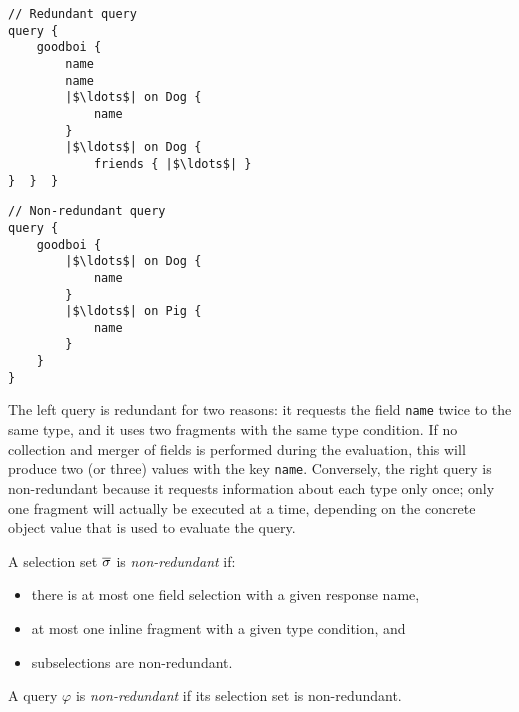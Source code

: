 \smallskip

\begin{minipage}[t]{.25\textwidth}
\begin{verbatim}
// Redundant query
query {
    goodboi {
        name
        name
        |$\ldots$| on Dog {
            name
        }
        |$\ldots$| on Dog {
            friends { |$\ldots$| }
}  }  }
\end{verbatim}
\end{minipage}%
\begin{minipage}[t]{.25\textwidth}
\begin{verbatim}
// Non-redundant query
query {
    goodboi {
        |$\ldots$| on Dog {
            name
        }
        |$\ldots$| on Pig {
            name
        }
    } 
}
\end{verbatim} 
\end{minipage}

\bigskip

The left query is redundant for two reasons: it requests the field
\texttt{name} twice to the same type, and it uses two fragments with
the same type condition. If no collection and merger
of fields is performed during the evaluation, this will produce two (or three) values with the key \texttt{name}. 
Conversely, the right query is non-redundant because it requests information about each type only once; only one fragment will actually be executed at a time, depending on the concrete object value that is used to evaluate the query.

\begin{definition}
A \gql selection set $\overline{\sigma}$ is \textit{non-redundant} if:
\begin{itemize}
    \item there is at most one field selection with a given response name, 
    
    \item at most one inline fragment with a given type condition, and
    
    \item subselections are non-redundant.
    \end{itemize}

\noindent    A \gql query $\varphi$ is \textit{non-redundant} if its selection set is non-redundant.

\end{definition}

